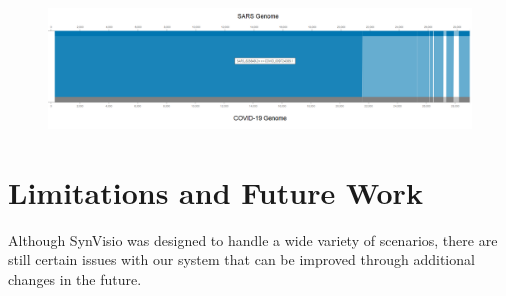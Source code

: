 \begin{figure}[h]
  \centering
  \includegraphics[width=1\linewidth]{images/ch_7_viral.PNG}
  \label{fig:ch_7_viral}
\end{figure}


 \section{Limitations and Future Work}
 
 Although SynVisio was designed to handle a wide variety of scenarios, there are still certain issues with our system that can be improved through additional changes in the future. 
 
